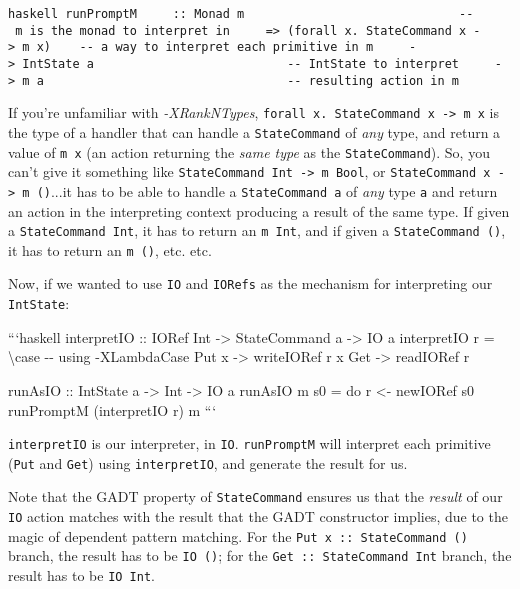 \documentclass[]{article}
\begin{document}
\texttt{haskell\ runPromptM\ \ \ \ \ ::\ Monad\ m\ \ \ \ \ \ \ \ \ \ \ \ \ \ \ \ \ \ \ \ \ \ \ \ \ \ \ \ \ \ -\/-\ m\ is\ the\ monad\ to\ interpret\ in\ \ \ \ \ =\textgreater{}\ (forall\ x.\ StateCommand\ x\ -\textgreater{}\ m\ x)\ \ \ \ -\/-\ a\ way\ to\ interpret\ each\ primitive\ in\ \textquotesingle{}m\textquotesingle{}\ \ \ \ \ -\textgreater{}\ IntState\ a\ \ \ \ \ \ \ \ \ \ \ \ \ \ \ \ \ \ \ \ \ \ \ \ \ \ \ -\/-\ IntState\ to\ interpret\ \ \ \ \ -\textgreater{}\ m\ a\ \ \ \ \ \ \ \ \ \ \ \ \ \ \ \ \ \ \ \ \ \ \ \ \ \ \ \ \ \ \ \ \ \ -\/-\ resulting\ action\ in\ \textquotesingle{}m\textquotesingle{}}

If you're unfamiliar with \emph{-XRankNTypes},
\texttt{forall\ x.\ StateCommand\ x\ -\textgreater{}\ m\ x} is the type of a
handler that can handle a \texttt{StateCommand} of \emph{any} type, and return a
value of \texttt{m\ x} (an action returning the \emph{same type} as the
\texttt{StateCommand}). So, you can't give it something like
\texttt{StateCommand\ Int\ -\textgreater{}\ m\ Bool}, or
\texttt{StateCommand\ x\ -\textgreater{}\ m\ ()}...it has to be able to handle a
\texttt{StateCommand\ a} of \emph{any} type \texttt{a} and return an action in
the interpreting context producing a result of the same type. If given a
\texttt{StateCommand\ Int}, it has to return an \texttt{m\ Int}, and if given a
\texttt{StateCommand\ ()}, it has to return an \texttt{m\ ()}, etc. etc.

Now, if we wanted to use \texttt{IO} and \texttt{IORefs} as the mechanism for
interpreting our \texttt{IntState}:

```haskell interpretIO :: IORef Int -\textgreater{} StateCommand a
-\textgreater{} IO a interpretIO r = \textbackslash{}case -\/- using
-XLambdaCase Put x -\textgreater{} writeIORef r x Get -\textgreater{} readIORef
r

runAsIO :: IntState a -\textgreater{} Int -\textgreater{} IO a runAsIO m s0 = do
r \textless{}- newIORef s0 runPromptM (interpretIO r) m ```

\texttt{interpretIO} is our interpreter, in \texttt{IO}. \texttt{runPromptM}
will interpret each primitive (\texttt{Put} and \texttt{Get}) using
\texttt{interpretIO}, and generate the result for us.

Note that the GADT property of \texttt{StateCommand} ensures us that the
\emph{result} of our \texttt{IO} action matches with the result that the GADT
constructor implies, due to the magic of dependent pattern matching. For the
\texttt{Put\ x\ ::\ StateCommand\ ()} branch, the result has to be
\texttt{IO\ ()}; for the \texttt{Get\ ::\ StateCommand\ Int} branch, the result
has to be \texttt{IO\ Int}.
\end{document}

